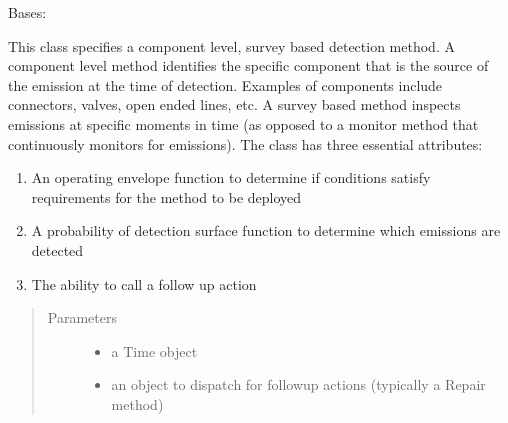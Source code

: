 \documentclass[letterpaper,10pt,english]{sphinxmanual}
\begin{document}
\begin{fulllineitems}
\label{\detokenize{index:feast.DetectionModules.comp_survey.CompSurvey}}
Bases: {\hyperref[\detokenize{index:feast.DetectionModules.abstract_detection_method.DetectionMethod}]{}}

This class specifies a component level, survey based detection method.
A component level method identifies the specific component that is the source of the
emission at the time of detection. Examples of components include connectors, valves, open ended lines, etc.
A survey based method inspects emissions at specific moments in time (as opposed to a monitor method that
continuously monitors for emissions).
The class has three essential attributes:
\begin{enumerate}
%
\item {} 
An operating envelope function to determine if conditions satisfy requirements for the method to be deployed

\item {} 
A probability of detection surface function to determine which emissions are detected

\item {} 
The ability to call a follow up action

\end{enumerate}
\begin{quote}\begin{description}
\item[{Parameters}] \leavevmode\begin{itemize}
\item {} 
 \textendash{} a Time object

\item {} 
 \textendash{} an object to dispatch for follow\sphinxhyphen{}up actions (typically a Repair method)


\end{itemize}
\end{description}
\end{quote}
\end{fulllineitems}
\end{document}
